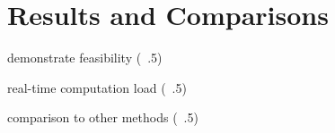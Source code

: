 \section{Results and Comparisons \label{sec:results}}
demonstrate feasibility (~.5)

real-time computation load (~.5)

comparison to other methods (~.5)